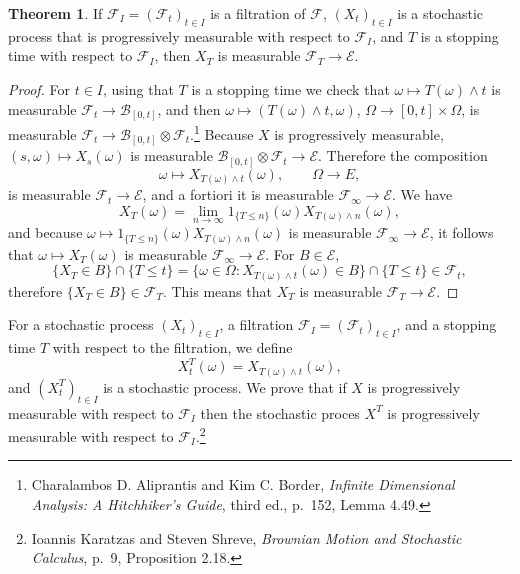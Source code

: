 \documentclass{article}
\theoremstyle{definition}
\newtheorem{theorem}{Theorem}
\theoremstyle{definition}
\begin{document}
\begin{theorem}
If $\mathscr{F}_I  =(\mathscr{F}_t)_{t \in I}$ is a filtration of $\mathscr{F}$,
$(X_t)_{t \in I}$ is a stochastic process that is progressively measurable with respect to $\mathscr{F}_I$,
and $T$ is a stopping time with respect to $\mathscr{F}_I$, then $X_T$ is measurable $\mathscr{F}_T \to \mathscr{E}$.
\label{XT}
\end{theorem}
\begin{proof}
For $t \in I$, using that $T$ is a stopping time we check that $\omega \mapsto T(\omega) \wedge t$ is measurable $\mathscr{F}_t
\to \mathscr{B}_{[0,t]}$, and then $\omega \mapsto (T(\omega) \wedge t,\omega)$,
$\Omega \to [0,t] \times \Omega$,
 is measurable $\mathscr{F}_t \to \mathscr{B}_{[0,t]} \otimes \mathscr{F}_t$.\footnote{Charalambos D. Aliprantis and Kim C. Border, {\em Infinite Dimensional Analysis:
A Hitchhiker's Guide}, third ed., p.~152, Lemma 4.49.}
Because $X$ is progressively
 measurable, $(s,\omega) \mapsto X_s(\omega)$ is measurable
 $\mathscr{B}_{[0,t]} \otimes \mathscr{F}_t \to \mathscr{E}$. Therefore the composition
 \[
 \omega \mapsto X_{T(\omega) \wedge t}(\omega), \qquad \Omega \to E,
 \]
 is measurable $\mathscr{F}_t \to \mathscr{E}$, and a fortiori it is measurable
 $\mathscr{F}_\infty \to \mathscr{E}$.
 We have
 \[
 X_T(\omega) = \lim_{n \to \infty} 1_{\{T \leq n\}}(\omega) X_{T(\omega) \wedge n}(\omega),
 \]
 and because 
 $\omega \mapsto 1_{\{T \leq n\}}(\omega) X_{T(\omega) \wedge n}(\omega)$ is measurable
 $\mathscr{F}_\infty \to \mathscr{E}$, 
 it follows that $\omega \mapsto  X_T(\omega)$  is measurable $\mathscr{F}_\infty \to \mathscr{E}$.
 For $B \in \mathscr{E}$,
 \[
\{X_T \in B\} \cap \{T \leq t\} = \{\omega \in \Omega: X_{T(\omega) \wedge t}(\omega) \in B\} \cap \{T \leq t\} \in \mathscr{F}_t,
 \]
therefore $\{X_T \in B\} \in \mathscr{F}_T$. This means that
$X_T$ is measurable $\mathscr{F}_T \to \mathscr{E}$.
\end{proof}


For a stochastic process $(X_t)_{t \in I}$, a filtration $\mathscr{F}_I =(\mathscr{F}_t)_{t \in I}$, and a stopping time
$T$ with respect to the filtration, we define 
\[
X^T_t(\omega) = X_{T(\omega) \wedge t}(\omega),
\]
and $(X^T_t)_{t \in I}$ is a stochastic process.
We prove that if $X$ is progressively measurable with respect to  $\mathscr{F}_I$ then
the stochastic proces $X^T$ is progressively measurable with respect to $\mathscr{F}_I$.\footnote{Ioannis Karatzas and Steven Shreve,
{\em Brownian Motion and Stochastic Calculus}, 
p.~9, Proposition 2.18.}
\end{document}
